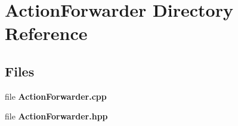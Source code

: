 \section{Action\+Forwarder Directory Reference}
\label{dir_549304cdcc2e6168083a7539373fc28b}
\subsection*{Files}
\begin{DoxyCompactItemize}
\item 
file \textbf{ Action\+Forwarder.\+cpp}
\item 
file \textbf{ Action\+Forwarder.\+hpp}
\end{DoxyCompactItemize}
